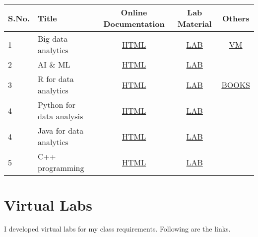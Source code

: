 \documentclass[10pt]{article}
\begin{document}
\begin{table}[ht]
\centering 
\begin{tabular}{llccc} \hline 
S.No. & Title & Online Documentation & Lab Material & Others \\ \hline 
1 &  Big data analytics & \href{https://kamakshaiah.github.io/hadoop-kichidi/}{HTML} & \href{https://github.com/Kamakshaiah/hadoop-lab-1}{LAB} & \href{https://github.com/Kamakshaiah/Sdoop}{VM} \\
2 &  AI \& ML & \href{https://kamakshaiah.github.io/aiml-book/ai}{HTML} & \href{https://github.com/Kamakshaiah/aiml-lab}{LAB} \\
3 &  R for data analytics & \href{}{HTML} & \href{https://github.com/Kamakshaiah/R-Lab}{LAB} & \href{https://www.amazon.com/~/e/B08C7SVM7V}{BOOKS} \\
4 &  Python for data analysis & \href{}{HTML} & \href{https://github.com/Kamakshaiah/python-lab/}{LAB} & \\
4 &  Java for data analytics & \href{https://kamakshaiah.github.io/java-book/}{HTML} & \href{https://github.com/Kamakshaiah/Java-Exercises}{LAB} &  \\
5 &  C++ programming & \href{https://kamakshaiah.github.io/cpp-book/cpp}{HTML} & \href{https://github.com/Kamakshaiah/cpp-exercises}{LAB} & \\ \hline 

\end{tabular}
\end{table}

\section{\bfseries{Virtual Labs}} \hline \vspace{0.5cm}

I developed virtual labs for my class requirements. Following are the links. 
\end{document}
